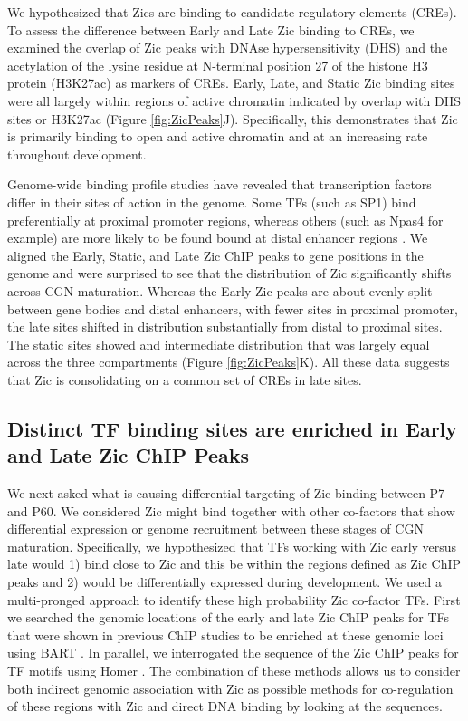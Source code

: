 \documentclass[fleqn,10pt]{wlscirep}
\begin{document}
We hypothesized that Zics are binding to candidate regulatory elements (CREs). To assess the difference between Early and Late Zic binding to CREs, we examined the overlap of Zic peaks with DNAse hypersensitivity (DHS) and the acetylation of the lysine residue at N-terminal position 27 of the histone H3 protein (H3K27ac) as markers of CREs. Early, Late, and Static Zic binding sites were all largely within regions of active chromatin indicated by overlap with DHS sites or H3K27ac (Figure \ref{fig:ZicPeaks}J). Specifically, this demonstrates that Zic is primarily binding to open and active chromatin and at an increasing rate throughout development. 

Genome-wide binding profile studies have revealed that transcription factors differ in their sites of action in the genome. Some TFs (such as SP1) bind preferentially at proximal promoter regions, whereas others (such as Npas4 for example) are more likely to be found bound at distal enhancer regions \cite{Kaczynski2003Sp1-Factors, Lyons2011MechanismsTranscription}. We aligned the Early, Static, and Late Zic ChIP peaks to gene positions in the genome and were surprised to see that the distribution of Zic significantly shifts across CGN maturation. Whereas the Early Zic peaks are about evenly split between gene bodies and distal enhancers, with fewer sites in proximal promoter, the late sites shifted in distribution substantially from distal to proximal sites. The static sites showed and intermediate distribution that was largely equal across the three compartments (Figure \ref{fig:ZicPeaks}K). All these data suggests that Zic is consolidating on a common set of CREs in late sites. 

\subsection*{Distinct TF binding sites are enriched in Early and Late Zic ChIP Peaks}
We next asked what is causing differential targeting of Zic binding between P7 and P60. We considered Zic might bind together with other co-factors that show differential expression or genome recruitment between these stages of CGN maturation. Specifically, we hypothesized that TFs working with Zic early versus late would 1) bind close to Zic and this be within the regions defined as Zic ChIP peaks and 2) would be differentially expressed during development. We used a  multi-pronged approach to identify these high probability Zic co-factor TFs. First we searched the genomic locations of the early and late Zic ChIP peaks for TFs that were shown in previous ChIP studies to be enriched at these genomic loci using BART \cite{Zhenjiawang2018BART:Profiles, Ma2021BARTweb:Analysis}. In parallel, we interrogated the sequence of the Zic ChIP peaks for TF motifs using Homer \cite{}. The combination of these methods allows us to consider both indirect genomic association with Zic as possible methods for co-regulation of these regions with Zic and direct DNA binding by looking at the sequences. 
\end{document}
